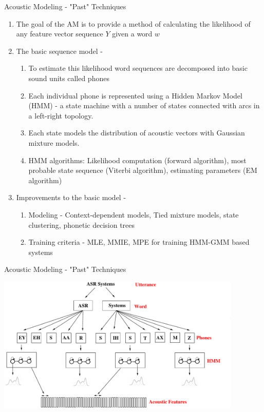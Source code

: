 \begin{frame}{Acoustic Modeling - "Past" Techniques}
\begin{enumerate}
\item The \alert{goal of the AM} is to provide a method of calculating the likelihood
of any feature vector sequence $Y$ given a word $w$
\item \alert{The basic \alert{sequence} model} \cite{gales2008application,rabiner1986introduction}-
\begin{enumerate}
\item To estimate this likelihood word sequences are decomposed into basic sound units
called phones
\item Each individual phone is represented using a Hidden Markov Model (HMM) - a state machine with 
a number of states connected with arcs in a left-right topology.
\item Each state models the distribution of acoustic vectors with Gaussian mixture models.
\item HMM algorithms: Likelihood computation (forward algorithm), most probable state sequence (Viterbi algorithm), 
estimating parameters (EM algorithm)
\end{enumerate}
\item \alert{Improvements to the basic model} \cite{bahl1986maximum,young1994state,povey2001improved}-
\begin{enumerate}
\item Modeling - Context-dependent models, Tied mixture models, state clustering, phonetic decision trees
\item Training criteria - MLE, MMIE, MPE for training HMM-GMM based systems
\end{enumerate}
\end{enumerate}
\end{frame}

\begin{frame}{Acoustic Modeling - "Past" Techniques}
\begin{center}
\includegraphics[height=65mm]{figures/am-gmm}
\end{center}
\end{frame}

